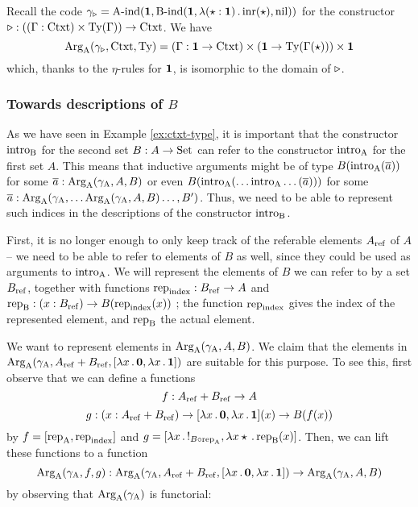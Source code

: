 \documentclass{article}
\begin{document}

\begin{example}
  Recall the code $\gamma_{\triangleright} = \text{A-ind}(\mathbf{1}, \text{B-ind}(\mathbf{1},
  \lambda (\star : \mathbf{1})\,.\,\text{inr}(\star), \text{nil}))$ for the
  constructor $\triangleright : ((\Gamma : \text{Ctxt}) \times \text{Ty}(\Gamma)) \to
  \text{Ctxt}$. We have 
\[
\text{Arg}_{\mathrm{A}}(\gamma_{\triangleright}, \text{Ctxt}, \text{Ty}) = (\Gamma : \mathbf{1} \to \text{Ctxt})
\times (\mathbf{1} \to \text{Ty}(\Gamma(\star))) \times \mathbf{1}
\]
which, thanks to the $\eta$-rules for $\mathbf{1}$, is isomorphic to the
domain of $\triangleright$. 
\blackqed
\end{example}

\subsubsection{Towards descriptions of $B$} %
\label{sec:towards-SPB}

As we have seen in Example \ref{ex:ctxt-type}, it is important that
the constructor $\text{intro}_{\mathrm{B}}$ for the second set $B : A \to \text{Set}$ can
refer to the constructor $\text{intro}_{\mathrm{A}}$ for the first set $A$. This means
that inductive arguments might be of type $B(\text{intro}_{\mathrm{A}}(\overline{a}))$
for some $\overline{a} : \text{Arg}_{\mathrm{A}}(\gamma_{\mathrm{A}}, A, B)$ or even
$B(\text{intro}_{\mathrm{A}}(\ldots\text{intro}_{\mathrm{A}}\ldots(\overline{a})))$ for some $\overline{a}
: \text{Arg}_{\mathrm{A}}(\gamma_{\mathrm{A}}, \ldots \text{Arg}_{\mathrm{A}}(\gamma_{\mathrm{A}}, A, B)\ldots, B')$. Thus, we
need to be able to represent such indices in the descriptions of the
constructor $\text{intro}_{\mathrm{B}}$.

First, it is no longer enough to only keep track of the referable
elements $A_{\mathrm{ref}}$ of $A$ -- we need to be able to refer to elements of
$B$ as well, since they could be used as arguments to $\text{intro}_{\mathrm{A}}$. We
will represent the elements of $B$ we can refer to by a set $B_{\mathrm{ref}}$,
together with functions $\text{rep}_{\mathrm{index}} : B_{\mathrm{ref}} \to A$ and $\text{rep}_{\mathrm{B}} : (x :
B_{\mathrm{ref}}) \to B(\text{rep}_{\mathrm{index}}(x))$ ; the function $\text{rep}_{\mathrm{index}}$ gives the index
of the represented element, and $\text{rep}_{\mathrm{B}}$ the actual element.


We want to represent elements in $\text{Arg}_{\mathrm{A}}(\gamma_{\mathrm{A}}, A, B)$. We claim that
the elements in $\text{Arg}_{\mathrm{A}}(\gamma_{\mathrm{A}}, A_{\mathrm{ref}} + B_{\mathrm{ref}}, [\lambda x\,.\,\mathbf{0},
\lambda x\,.\,\mathbf{1}])$ are suitable for this purpose. To see this,
first observe that we can define a functions
\[
f : A_{\mathrm{ref}} + B_{\mathrm{ref}} \to A
\]
%
%
\[
g : (x : A_{\mathrm{ref}} + B_{\mathrm{ref}}) \to
    [\lambda x\,.\,\mathbf{0}, \lambda x\,.\,\mathbf{1}](x)
      \to B(f(x))
\]
%
by $f = [\text{rep}_{\mathrm{A}}, \text{rep}_{\mathrm{index}}]$ and $g = [\lambda x\,.\,!_{B \circ
  \text{rep}_{\mathrm{A}}}, \lambda x \star\,.\, \text{rep}_{\mathrm{B}}(x)]$. Then, we can lift these
functions to a function
%
\[
\text{Arg}_{\mathrm{A}}(\gamma_{\mathrm{A}}, f, g) : \text{Arg}_{\mathrm{A}}(\gamma_{\mathrm{A}}, A_{\mathrm{ref}} +B_{\mathrm{ref}}, [\lambda x\,.\,\mathbf{0}, \lambda x\,.\,\mathbf{1}]) \to
                       \text{Arg}_{\mathrm{A}}(\gamma_{\mathrm{A}}, A, B)
\]
%
by observing that $\text{Arg}_{\mathrm{A}}(\gamma_{\mathrm{A}})$ is functorial:
\end{document}
